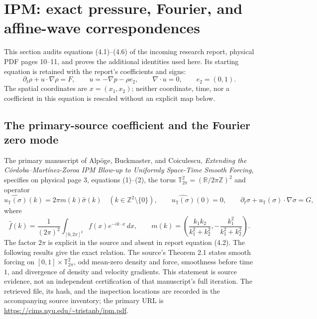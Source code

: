 \section{IPM: exact pressure, Fourier, and affine-wave correspondences}
\label{sec:ipm-exact-bridge}

This section audits equations (4.1)--(4.6) of the incoming research report,
physical PDF pages 10--11, and proves the additional identities used here.
Its starting equation is retained with the report's coefficients and signs:
\begin{equation}\label{eq:ipm-report-darcy}
 \partial_t\rho+u\cdot\nabla\rho=F,\qquad
 u=-\nabla p-\rho e_2,\qquad \nabla\cdot u=0,
 \qquad e_2=(0,1).
\end{equation}
The spatial coordinates are $x=(x_1,x_2)$; neither coordinate, time, nor a
coefficient in this equation is rescaled without an explicit map below.

\subsection{The primary-source coefficient and the Fourier zero mode}

The primary manuscript of Alp\"oge, Buckmaster, and Coiculescu,
\emph{Extending the C\'ordoba--Mart\'inez-Zoroa IPM Blow-up to Uniformly
Space-Time Smooth Forcing}, specifies on physical page 3, equations (1)--(2),
the torus $\mathbb T^2_{2\pi}=(\mathbb R/2\pi\mathbb Z)^2$ and operator
\begin{equation}\label{eq:ipm-source-operator}
 \widehat{u_{\mathbb T}(\sigma)}(k)=2\pi m(k)\widehat\sigma(k)
 \quad(k\in\mathbb Z^2\setminus\{0\}),\qquad
 \widehat{u_{\mathbb T}(\sigma)}(0)=0,
 \qquad \partial_t\sigma+u_{\mathbb T}(\sigma)\cdot\nabla\sigma=G,
\end{equation}
where
\begin{equation}\label{eq:ipm-symbol}
 \widehat f(k)=\frac1{(2\pi)^2}\int_{[0,2\pi]^2}f(x)e^{-ik\cdot x}\,dx,
 \qquad
 m(k)=\left(\frac{k_1k_2}{k_1^2+k_2^2},
             -\frac{k_1^2}{k_1^2+k_2^2}\right).
\end{equation}
The factor $2\pi$ is explicit in the source and absent in report equation
(4.2). The following results give the exact relation. The source's
Theorem 2.1 states smooth forcing on $[0,1]\times\mathbb T^2_{2\pi}$,
odd mean-zero density and force, smoothness before time $1$, and divergence
of density and velocity gradients. This statement is source evidence, not
an independent certification of that manuscript's full iteration.
The retrieved file, its hash, and the inspection locations are recorded in
the accompanying source inventory; the primary URL is
\url{https://cims.nyu.edu/~tristanb/ipm.pdf}.


